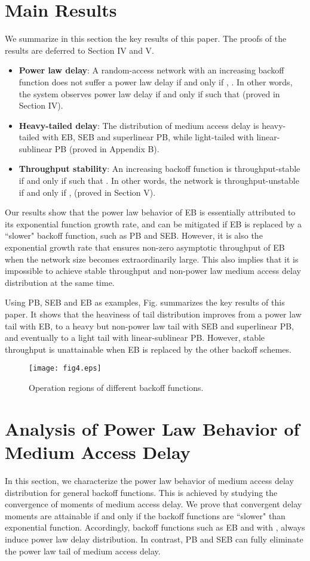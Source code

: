 \documentclass[journal]{IEEEtran}
\begin{document}
\section{Main Results}
We summarize in this section the key results of this paper. The proofs of the results are deferred to Section IV and V.
\begin{itemize}
  \item \textbf{Power law delay}: A random-access network with an increasing backoff function  does not suffer a power law delay if and only if , . In other words, the system observes power law delay if and only if  such that  (proved in Section IV).
    \item \textbf{Heavy-tailed delay}: The distribution of medium access delay is heavy-tailed with EB, SEB and superlinear PB, while light-tailed with linear-sublinear PB (proved in Appendix B).
  \item \textbf{Throughput stability}: An increasing backoff function  is throughput-stable if and only if  such that . In other words, the network is throughput-unstable if and only if ,  (proved in Section V).
\end{itemize}

Our results show that the power law behavior of EB is essentially attributed to its exponential function growth rate, and can be mitigated if EB is replaced by a ``slower" backoff function, such as PB and SEB. However, it is also the exponential growth rate that ensures non-zero asymptotic throughput of EB when the network size becomes extraordinarily large. This also implies that it is impossible to achieve stable throughput and non-power law medium access delay distribution at the same time.

Using PB, SEB and EB as examples, Fig.  summarizes the key results of this paper. It shows that the heaviness of tail distribution improves from a power law tail with EB, to a heavy but non-power law tail with SEB and superlinear PB, and eventually to a light tail with linear-sublinear PB. However, stable throughput is unattainable when EB is replaced by the other backoff schemes.

\begin{figure}
\centering
  \begin{center}
    \texttt{[image: fig4.eps]}
  \end{center}
  \caption{Operation regions of different backoff functions.}
  \label{54}
\end{figure}

\section{Analysis of Power Law Behavior of Medium Access Delay}
In this section, we characterize the power law behavior of medium access delay distribution for general backoff functions. This is achieved by studying the convergence of moments of medium access delay. We prove that convergent delay moments are attainable if and only if the backoff functions are ``slower" than exponential function. Accordingly, backoff functions such as EB and  with , always induce power law delay distribution. In contrast, PB and SEB can fully eliminate the power law tail of medium access delay.
\end{document}
